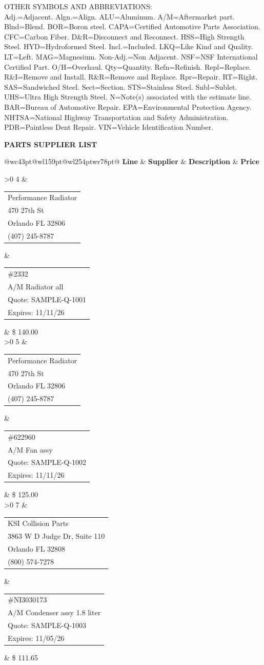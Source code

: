 \documentclass[letterpaper,10pt]{article}
\makeatletter
\newcommand{\body}{\fontsize{8}{13.5}\selectfont}        %
\newcommand{\sect}{\fontsize{10}{13.3}\bfseries\selectfont} %
\newenvironment{suppliers}{%
  \body\setcounter{supn}{0}
  \begin{longtable}{@{}w{c}{43pt}@{\hspace{3pt}}w{l}{159pt}@{\hspace{3pt}}w{l}{254pt}w{r}{78pt}@{}}
  \textbf{Line} & \textbf{Supplier} & \textbf{Description} & \textbf{Price}\\ \cline{2-3}\endhead
}{\end{longtable}}
\newcounter{supn}
\newcommand{\Supplier}[9]{\ifnum\value{supn}>0 \cline{2-3}\noalign{\vskip 5pt}\fi\stepcounter{supn}%
  #1 & \begin{tabular}[t]{@{}l@{}}#2\\#3\\#4\\#5\end{tabular} & \begin{tabular}[t]{@{}l@{}}#6\\#7\\#8\\#9\end{tabular} & \SupplierPrice}
\newcommand{\SupplierPrice}[1]{#1\\[15pt]}
\makeatother
\begin{document}
\vspace{13.3pt}
OTHER SYMBOLS AND ABBREVIATIONS:\\
Adj.=Adjacent. Algn.=Align. ALU=Aluminum. A/M=Aftermarket part. Blnd=Blend. BOR=Boron steel. CAPA=Certified Automotive Parts Association. CFC=Carbon Fiber. D\&R=Disconnect and Reconnect. HSS=High Strength Steel. HYD=Hydroformed Steel. Incl.=Included. LKQ=Like Kind and Quality. LT=Left. MAG=Magnesium. Non-Adj.=Non Adjacent. NSF=NSF International Certified Part. O/H=Overhaul. Qty=Quantity. Refn=Refinish. Repl=Replace. R\&I=Remove and Install. R\&R=Remove and Replace. Rpr=Repair. RT=Right. SAS=Sandwiched Steel. Sect=Section. STS=Stainless Steel. Subl=Sublet. UHS=Ultra High Strength Steel. N=Note(s) associated with the estimate line. BAR=Bureau of Automotive Repair. EPA=Environmental Protection Agency. NHTSA=National Highway Transportation and Safety Administration. PDR=Paintless Dent Repair. VIN=Vehicle Identification Number.

\newpage
\body
\vspace*{-12pt}
\centerline{\sect PARTS SUPPLIER LIST}
\vspace{17pt}
\begin{suppliers}
  \Supplier{4}{Performance Radiator}{470 27th St}{Orlando FL 32806}{(407) 245-8787}{\#2332}{A/M Radiator all}{Quote: SAMPLE-Q-1001}{Expires: 11/11/26}{\$ 140.00}
  \Supplier{5}{Performance Radiator}{470 27th St}{Orlando FL 32806}{(407) 245-8787}{\#622960}{A/M Fan assy}{Quote: SAMPLE-Q-1002}{Expires: 11/11/26}{\$ 125.00}
  \Supplier{7}{KSI Collision Parts}{3863 W D Judge Dr, Suite 110}{Orlando FL 32808}{(800) 574-7278}{\#NI3030173}{A/M Condenser assy 1.8 liter}{Quote: SAMPLE-Q-1003}{Expires: 11/05/26}{\$ 111.65}
\end{suppliers}
\end{document}
